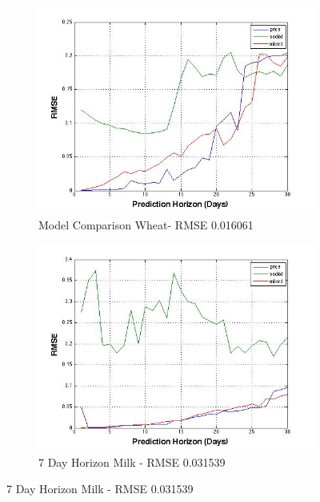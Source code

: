 \begin{figure}
        \centering
        \begin{subfigure}[b]{0.5\textwidth}
                \includegraphics[width=\textwidth]{img/model/results/result_wheat}
                \caption{Model Comparison Wheat- RMSE 0.016061}
                \label{fig:gull}
        \end{subfigure}%
           \begin{subfigure}[b]{0.5\textwidth}
                \includegraphics[width=\textwidth]{img/model/results/result_beef}
                \caption{7 Day Horizon Milk - RMSE 0.031539}
                \label{fig:gull}
        \end{subfigure}%
              \hfill    

\end{figure}
